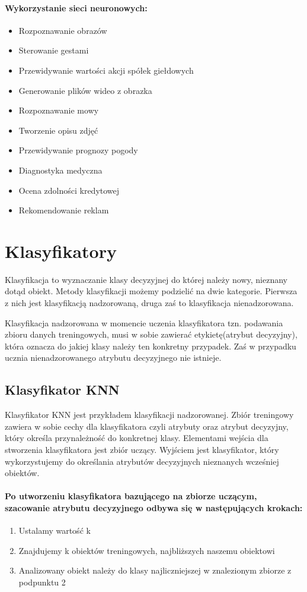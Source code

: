 \documentclass[a4paper,12pt,twoside,openany]{report}
\begin{document}
\paragraph{Wykorzystanie sieci neuronowych:}
\begin{itemize}
	\item Rozpoznawanie obrazów
	\item Sterowanie gestami
	\item Przewidywanie wartości akcji spółek giełdowych
	\item Generowanie plików wideo z obrazka
	\item Rozpoznawanie mowy
	\item Tworzenie opisu zdjęć
	\item Przewidywanie prognozy pogody
	\item Diagnostyka medyczna
	\item Ocena zdolności kredytowej
	\item Rekomendowanie reklam
	
\end{itemize}

\section{Klasyfikatory}
Klasyfikacja to wyznaczanie klasy decyzyjnej do której należy nowy, nieznany dotąd obiekt. Metody klasyfikacji możemy podzielić na dwie kategorie. Pierwsza z nich jest  klasyfikacją nadzorowaną, druga zaś to klasyfikacja nienadzorowana. 

Klasyfikacja nadzorowana w momencie uczenia klasyfikatora tzn. podawania zbioru danych treningowych, musi w sobie zawierać etykietę(atrybut decyzyjny), która oznacza do jakiej klasy należy ten konkretny przypadek. Zaś w przypadku ucznia nienadzorowanego atrybutu decyzyjnego nie istnieje.

\subsection{Klasyfikator KNN}
Klasyfikator KNN jest przykładem klasyfikacji nadzorowanej. Zbiór treningowy zawiera w sobie cechy dla klasyfikatora czyli atrybuty oraz atrybut decyzyjny, który określa przynależność do konkretnej klasy. Elementami wejścia dla stworzenia klasyfikatora jest zbiór uczący. Wyjściem jest klasyfikator, który wykorzystujemy do określania atrybutów decyzyjnych nieznanych wcześniej obiektów.

\paragraph{Po utworzeniu klasyfikatora bazującego na zbiorze uczącym, szacowanie atrybutu decyzyjnego odbywa się w następujących krokach: }
\begin{enumerate}
	\item Ustalamy wartość k
	\item Znajdujemy k obiektów treningowych, najbliższych naszemu obiektowi
	\item Analizowany obiekt należy do klasy najliczniejszej w znalezionym zbiorze z podpunktu 2
\end{enumerate}
\end{document}
